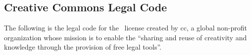 \begin{appendices}
    \chapter{Creative Commons Legal Code}
        \label{chapter:thesis:creative-commons-legal-code}
        \renewcommand{\section}[1]{%
            \par\refstepcounter{section}%
            \sectionmark{#1}%
        }
        \renewcommand{\subsection}[1]{%
            \par\refstepcounter{subsection}%
            \subsectionmark{#1}%
        }
        The following is the legal code for the \doclicenseLongNameRef~license created 
        by \Ac{cc}, a global non-profit organization whose mission is to enable the 
        ``sharing and reuse of creativity and knowledge through the provision of 
        free legal tools''.
        {
        \renewenvironment{quotation}{%
            \definecolor{silver}{rgb}{0.83, 0.83, 0.83}
            \setlength{\parindent}{0pt}
            \def\FrameCommand{%
                \hspace{1pt}%
                \colorbox{silver}%
            }%
            \MakeFramed{\advance\hsize-\width\FrameRestore}%
            \noindent\hspace{-4.55pt}%
            \begin{adjustwidth}{}{0pt}%
                \vspace{2pt}\vspace{2pt}%
        }
        {%
            \vspace{2pt}\end{adjustwidth}\endMakeFramed%
        }
        \doclicenseFullText
        }

\end{appendices}